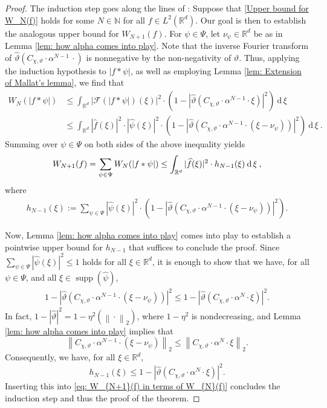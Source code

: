 \documentclass[11pt]{amsart}
\newcommand{\R}{{\mathbb{R}}}
\newcommand{\N}{\mathbb{N}}
\newcommand{\dxi}{\:\mathrm{d}\,\xi\:}
\newcommand{\norm}[1]{\ensuremath{\left\lVert\text{}#1\text{}\right\rVert}}
\DeclareMathOperator{\supp}{supp}
\newenvironment{proof sketch} {\textit{Proof sketch.}}{}
\begin{document}
\begin{proof}
    The induction step goes along the lines of \cite[Theorem 1]{wiatowski2017energy}: Suppose that \eqref{Upper bound for W_N(f)} holds for some $N \in \N$ for all $f\in L^2(\R^d)$. Our goal is then to establish the analogous upper bound for $W_{N+1}(f)$. 
    For $\psi \in \Psi$, let $\nu_\psi \in \R^d$ be as in Lemma \ref{lem: how alpha comes into play}. Note that the inverse Fourier transform of $\widehat{\vartheta}\left(C_{\chi,\vartheta} \cdot \alpha^{N-1}\,\cdot\right)$ is nonnegative by the non-negativity of $\vartheta$. Thus, applying the induction hypothesis to $|f*\psi|$, as well as employing Lemma \ref{lem: Extension of Mallat's lemma}, we find that
    \begin{align*}
      W_{N}(|f*\psi|)
      &\leq \int_{\R^d} |\mathcal{F}(|f*\psi|)(\xi)|^2 \cdot \left(1-\left|\widehat{\vartheta}\left(C_{\chi,\vartheta} \cdot \alpha^{N-1} \cdot \xi\right)\right|^2\right) \dxi \nonumber\\
      &\leq \int_{\R^d} |\widehat{f}(\xi)|^2 \cdot |\widehat{\psi}(\xi)|^2 \cdot \left(1-\left|\widehat{\vartheta}\left(C_{\chi,\vartheta} \cdot \alpha^{N-1} \cdot (\xi-\nu_\psi)\right)\right|^2\right)\dxi.
    \end{align*}
    Summing over $\psi \in \Psi$ on both sides of the above inequality yields
    \begin{align}\label{eq: W_{N+1}(f) in terms of W_{N}(f)}
      W_{N+1}(f)=\sum_{\psi \in \Psi} W_{N}(|f*\psi|)\leq \int_{\R^d} |\widehat{f}(\xi)|^2 \cdot h_{N-1}(\xi) \dxi,
    \end{align}
    where
    \begin{align*}
      h_{N-1}(\xi):=\sum_{\psi \in \Psi} |\widehat{\psi}(\xi)|^2 \cdot \left(1-\left|\widehat{\vartheta}\left(C_{\chi,\vartheta} \cdot \alpha^{N-1} \cdot (\xi-\nu_\psi)\right)\right|^2\right).
    \end{align*}
  
    Now, Lemma \ref{lem: how alpha comes into play} comes into play to establish a pointwise upper bound for $h_{N-1}$ that suffices to conclude the proof. Since $\sum_{\psi \in \Psi} |\widehat{\psi}(\xi)|^2 \leq 1$ holds for all $\xi \in \R^d$, it is enough to show that we have, for all $\psi \in \Psi$, and all $\xi \in \supp(\widehat{\psi})$,
    \begin{align*}
      1-\left|\widehat{\vartheta}\left(C_{\chi,\vartheta} \cdot \alpha^{N-1} \cdot (\xi-\nu_\psi)\right)\right|^2 \leq 1-\left|\widehat{\vartheta}\left(C_{\chi,\vartheta} \cdot \alpha^{N} \cdot \xi\right)\right|^2.
    \end{align*}
    In fact, $1-|\widehat{\vartheta}|^2=1-\eta^2(\norm{\cdot}_2)$, where $1-\eta^2$ is nondecreasing, and Lemma \ref{lem: how alpha comes into play} implies that
    \[\norm{C_{\chi,\vartheta} \cdot \alpha^{N-1} \cdot (\xi-\nu_\psi)}_2 \leq \norm{C_{\chi,\vartheta} \cdot \alpha^{N} \cdot \xi}_2.\]
    Consequently, we have, for all $\xi \in \R^d$,
    \[h_{N-1}(\xi)\leq 1-\left|\widehat{\vartheta}\left(C_{\chi,\vartheta} \cdot \alpha^{N} \cdot \xi\right)\right|^2.\]
    Inserting this into \eqref{eq: W_{N+1}(f) in terms of W_{N}(f)} concludes the induction step and thus the proof of the theorem.
  \end{proof}
  
\end{document}
